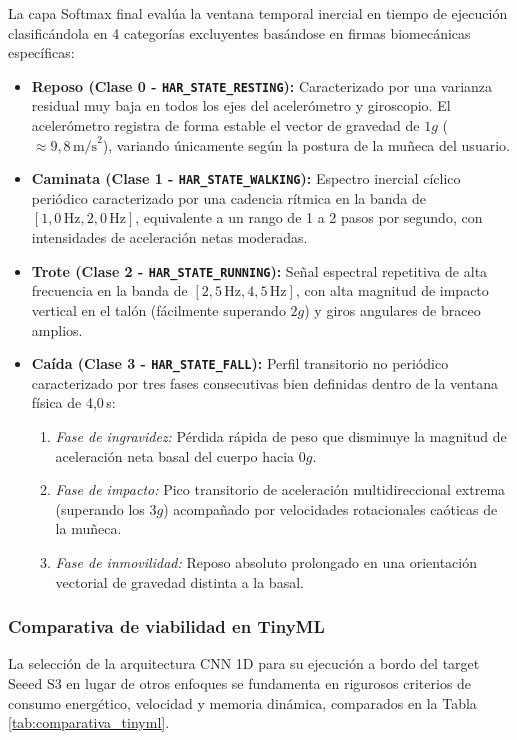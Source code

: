 \documentclass[letterpaper,11pt]{article}
\newcommand{\rtabla}[1]{Tabla \ref{#1}}
\begin{document}
La capa Softmax final evalúa la ventana temporal inercial en tiempo de ejecución clasificándola en 4 categorías excluyentes basándose en firmas biomecánicas específicas:
\begin{itemize}
    \item \textbf{Reposo (Clase 0 - \texttt{HAR\_STATE\_RESTING}):} Caracterizado por una varianza residual muy baja en todos los ejes del acelerómetro y giroscopio. El acelerómetro registra de forma estable el vector de gravedad de $1g$ ($\approx 9,8\,\text{m/s}^2$), variando únicamente según la postura de la muñeca del usuario.
    \item \textbf{Caminata (Clase 1 - \texttt{HAR\_STATE\_WALKING}):} Espectro inercial cíclico periódico caracterizado por una cadencia rítmica en la banda de $[1,0\,\text{Hz}, 2,0\,\text{Hz}]$, equivalente a un rango de 1 a 2 pasos por segundo, con intensidades de aceleración netas moderadas.
    \item \textbf{Trote (Clase 2 - \texttt{HAR\_STATE\_RUNNING}):} Señal espectral repetitiva de alta frecuencia en la banda de $[2,5\,\text{Hz}, 4,5\,\text{Hz}]$, con alta magnitud de impacto vertical en el talón (fácilmente superando $2g$) y giros angulares de braceo amplios.
    \item \textbf{Caída (Clase 3 - \texttt{HAR\_STATE\_FALL}):} Perfil transitorio no periódico caracterizado por tres fases consecutivas bien definidas dentro de la ventana física de 4,0\,s:
    \begin{enumerate}
        \item \textit{Fase de ingravidez:} Pérdida rápida de peso que disminuye la magnitud de aceleración neta basal del cuerpo hacia $0g$.
        \item \textit{Fase de impacto:} Pico transitorio de aceleración multidireccional extrema (superando los $3g$) acompañado por velocidades rotacionales caóticas de la muñeca.
        \item \textit{Fase de inmovilidad:} Reposo absoluto prolongado en una orientación vectorial de gravedad distinta a la basal.
    \end{enumerate}
\end{itemize}

\subsubsection{Comparativa de viabilidad en TinyML}

La selección de la arquitectura CNN 1D para su ejecución a bordo del target Seeed S3 en lugar de otros enfoques se fundamenta en rigurosos criterios de consumo energético, velocidad y memoria dinámica, comparados en la \rtabla{tab:comparativa_tinyml}.
\end{document}
